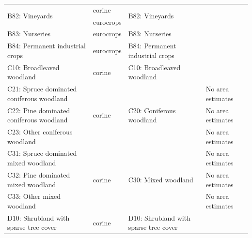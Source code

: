 \begin{table}[]
{\begin{tabular}{llll}
\multirow{2}{*}{B82: Vineyards}               & corine                  & \multirow{2}{*}{B82: Vineyards}                       &                                                           \\
                                              & eurocrops               &                                                       &                                                           \\
B83: Nurseries                                & eurocrops               & B83: Nurseries                                        &                                                           \\
B84: Permanent industrial crops               & eurocrops               & B84: Permanent industrial crops                       &                                                           \\
C10: Broadleaved woodland                     & corine                  & C10: Broadleaved woodland                             &                                                           \\
C21: Spruce dominated coniferous woodland     & \multirow{3}{*}{corine} & \multirow{3}{*}{C20: Coniferous woodland}             & No area estimates                                         \\
C22: Pine dominated coniferous woodland       &                         &                                                       & No area estimates                                         \\
C23: Other coniferous woodland                &                         &                                                       & No area estimates                                         \\
C31: Spruce dominated mixed woodland          & \multirow{3}{*}{corine} & \multirow{3}{*}{C30: Mixed woodland}                  & No area estimates                                         \\
C32: Pine dominated mixed woodland            &                         &                                                       & No area estimates                                         \\
C33: Other mixed woodland                     &                         &                                                       & No area estimates                                         \\
D10: Shrubland with sparse tree cover         & corine                  & D10: Shrubland with sparse tree cover                 &                                                           \\

\end{tabular}}
\end{table}
